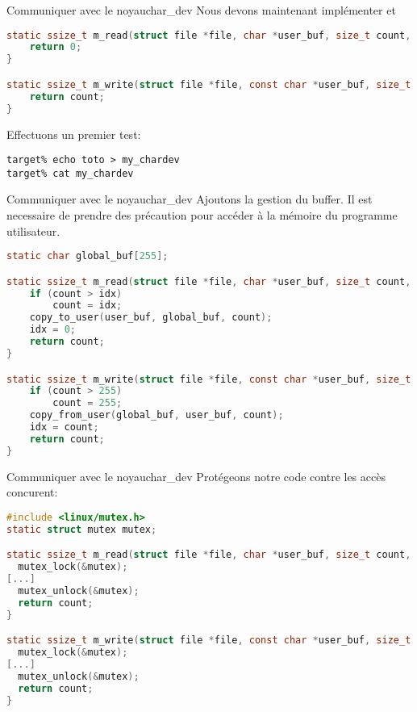 \begin{frame}[fragile=singleslide]{Communiquer avec le noyau}{char\_dev}
Nous devons maintenant implémenter  et 
  \begin{lstlisting}[language=c]
static ssize_t m_read(struct file *file, char *user_buf, size_t count, loff_t *ppos) {
    return 0;
}

static ssize_t m_write(struct file *file, const char *user_buf, size_t count, loff_t *ppos) {
    return count;
}
  \end{lstlisting}
Effectuons un premier test:
  \begin{lstlisting}
target% echo toto > my_chardev
target% cat my_chardev
  \end{lstlisting}
\end{frame}

\begin{frame}[fragile=singleslide]{Communiquer avec le noyau}{char\_dev}
Ajoutons la gestion du buffer. Il est necessaire de prendre des précaution pour
accéder à la mémoire du programme utilisateur.
  \begin{lstlisting}[language=c]
static char global_buf[255];

static ssize_t m_read(struct file *file, char *user_buf, size_t count, loff_t *ppos) {
    if (count > idx)
        count = idx;
    copy_to_user(user_buf, global_buf, count);
    idx = 0;
    return count;
}

static ssize_t m_write(struct file *file, const char *user_buf, size_t count, loff_t *ppos) {
    if (count > 255)
        count = 255;
    copy_from_user(global_buf, user_buf, count);
    idx = count;
    return count;
}
  \end{lstlisting}
\end{frame}

\begin{frame}[fragile=singleslide]{Communiquer avec le noyau}{char\_dev}
Protégeons notre code contre les accès concurent:
  \begin{lstlisting}[language=c]
#include <linux/mutex.h>
static struct mutex mutex;

static ssize_t m_read(struct file *file, char *user_buf, size_t count, loff_t *ppos) {
  mutex_lock(&mutex);
[...]
  mutex_unlock(&mutex);
  return count;
}

static ssize_t m_write(struct file *file, const char *user_buf, size_t count, loff_t *ppos) {
  mutex_lock(&mutex);
[...]
  mutex_unlock(&mutex);
  return count;
}
  \end{lstlisting}
\end{frame}

